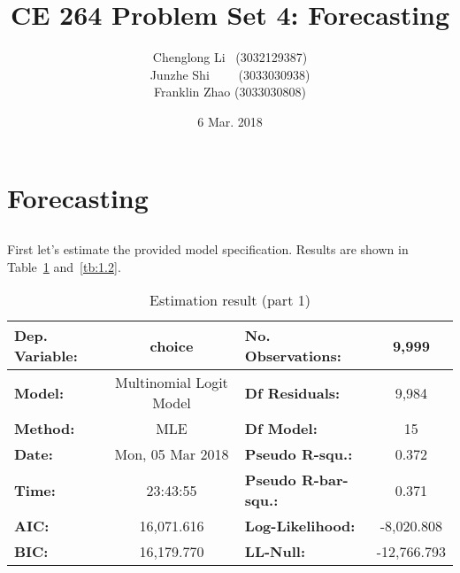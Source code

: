 \documentclass[11pt]{article}
\title{CE 264 Problem Set 4: Forecasting}
\date{6 Mar. 2018}
\author{Chenglong Li \ (3032129387)\\ Junzhe Shi \ \ \ \  (3033030938)\\ Franklin Zhao (3033030808)}
\begin{document}
	
	\maketitle
	\renewcommand\theequation{\arabic{equation}}
	\renewcommand{\figurename}{Fig.}
	\renewcommand\thesection{Part \arabic{section}}
	\renewcommand\thesubsection{Task \arabic{subsection}:}
	\renewcommand\thesubsubsection{Question (\alph{subsubsection}):}
	\onehalfspacing	
\section{Forecasting}
\subsection{}
First let's estimate the provided model specification. Results are shown in Table~\ref{tb:1.1} and~\ref{tb:1.2}.  
\begin{table}[H]
	\centering
	\caption{\label{tb:1.1}Estimation result (part 1)}
	\vspace{4pt}
	\begin{tabular}{|l|c|l|c|}
		\hline
		\textbf{Dep. Variable:} &          choice         & \textbf{  No. Observations:  } &    9,999     \\\hline
		\textbf{Model:}         & Multinomial Logit Model & \textbf{  Df Residuals:      } &    9,984     \\\hline
		\textbf{Method:}        &           MLE           & \textbf{  Df Model:          } &      15      \\\hline
		\textbf{Date:}          &     Mon, 05 Mar 2018    & \textbf{  Pseudo R-squ.:     } &    0.372     \\\hline
		\textbf{Time:}          &         23:43:55        & \textbf{  Pseudo R-bar-squ.: } &    0.371     \\\hline
		\textbf{AIC:}           &        16,071.616       & \textbf{  Log-Likelihood:    } &  -8,020.808  \\\hline
		\textbf{BIC:}           &        16,179.770       & \textbf{  LL-Null:           } & -12,766.793  \\\hline
	\end{tabular}
\end{table}
\end{document}
